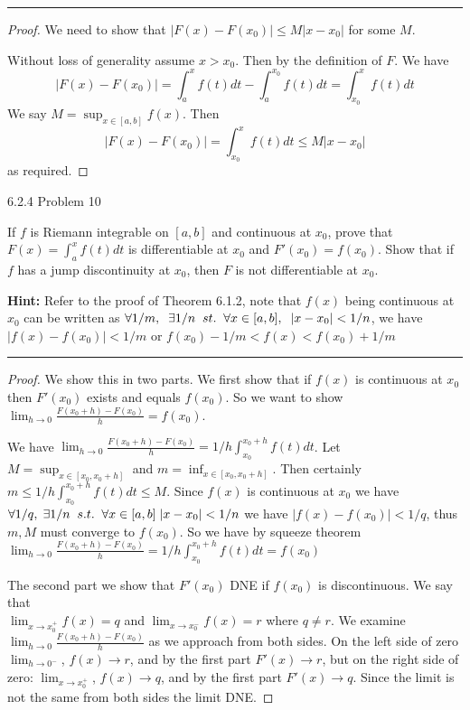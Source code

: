 \documentclass[11pt]{article}
\begin{document}
\hrule


\begin{proof}
    We need to show that $|F(x) - F(x_0)| \leq M |x - x_0|$ for some $M$.

    Without loss of generality assume $x > x_0$. Then by the definition of $F$. 
    We have $$|F(x) - F(x_0)| = \int_a ^x f(t) dt - \int_a ^{x_0} f(t) dt = \int_{x_0} ^x f(t) dt$$ 
    We say $M = \sup_{x \in [a,b]} f(x)$. 
    Then $$|F(x) - F(x_0)| = \int_{x_0} ^x f(t) dt \leq M |x - x_0|$$ as required.
\end{proof}

 6.2.4 Problem 10

If $f$ is Riemann integrable on $[a, b]$ and continuous at $x_0$, prove
that $F(x) = \int_a ^x f(t) dt$ is differentiable at $x_0$ and $F'(x_0) = f(x_0)$.
Show that if $f$ has a jump discontinuity at $x_0$, then $F$ is not
differentiable at $x_0$. 

\textbf{Hint: } Refer to the proof of Theorem 6.1.2, note that $f(x)$ being continuous at $x_0$
can be written as $\forall 1/m, \sp \exists 1/n \sp st. \sp \forall x \in [a,b], \sp |x - x_0| < 1/n$, we have $|f(x) - f(x_0)| < 1/m$
or $f(x_0) - 1/m < f(x) < f(x_0) + 1/m$
\hrule


\begin{proof}
    
    We show this in two parts. We first show that if $f(x)$ is continuous at $x_0$ then $F'(x_0)$ exists and equals $f(x_0)$.
    So we want to show $\lim_{h \to 0} \frac{F(x_0 + h) - F(x_0)}{h} = f(x_0)$.

    We have $\lim_{h \to 0} \frac{F(x_0 + h) - F(x_0)}{h} = 1/h \int_{x_0} ^{x_0 + h} f(t)dt$. Let $M = \sup_{x \in [x_0, x_0 + h]}$ and $m = \inf_{x \in [x_0, x_0 + h]}$.
    Then certainly $m \leq 1/h \int_{x_0} ^{x_0 + h} f(t)dt \leq M$. 
    Since $f(x)$ is continuous at $x_0$ we have \\
    $\forall 1/q, \; \exists 1/n \sp s.t. \sp \forall x \in [a,b] \; |x - x_0| < 1/n$ we have $|f(x) - f(x_0)| < 1/q$, thus $m, M$ must converge to $f(x_0)$.
    So we have by squeeze theorem \\
    $\lim_{h \to 0} \frac{F(x_0 + h) - F(x_0)}{h} = 1/h \int_{x_0} ^{x_0 + h} f(t)dt = f(x_0)$

    The second part we show that $F'(x_0)$ DNE if $f(x_0)$ is discontinuous. We say that \\$\lim_{x \to x_0^+} f(x) = q$
    and $\lim_{x \to x_0^-} f(x)= r$ where $q \neq r$. We examine $\lim_{h \to 0} \frac{F(x_0 + h) - F(x_0)}{h}$ as we approach from both sides.
    On the left side of zero $\lim_{h \to 0^-}$, $f(x) \to r$, and by the first part $F'(x) \to r$, but on the right side
    of zero: $\lim_{x \to x_0^+}$, $f(x) \to q$, and by the first part $F'(x) \to q$. Since the limit is not the same from both sides
    the limit DNE.
\end{proof}
\end{document}
